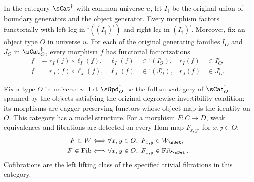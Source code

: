 \begin{resultblock}
\begin{theorem}
In the category $\sCat^{\dag}$ with common universe $u$, let $I_{\dag}$ be the original union of boundary generators and the object generator.
Every morphism factors functorially with left leg in ${}^{\square}((I_{\dag})^{\square})$ and right leg in $(I_{\dag})^{\square}$.
Moreover, fix an object type $O$ in universe $u$.
For each of the original generating families $I_O$ and $J_O$ in $\sCat^{\dag}_O$, every morphism $f$ has functorial factorizations
\begin{align}
f &= r_I(f)\circ\ell_I(f),
  &\ell_I(f)&\in{}^{\square}(I_O^{\square}),
  &r_I(f)&\in I_O^{\square}, \\
f &= r_J(f)\circ\ell_J(f),
  &\ell_J(f)&\in{}^{\square}(J_O^{\square}),
  &r_J(f)&\in J_O^{\square}.
\end{align}
\end{theorem}
\end{resultblock}

\begin{resultblock}
\begin{theorem}
Fix a type $O$ in universe $u$.
Let $\sGpd^{\dag}_O$ be the full subcategory of $\sCat^{\dag}_O$ spanned by the objects satisfying the original degreewise invertibility condition; its morphisms are dagger-preserving functors whose object map is the identity on $O$.
This category has a model structure.
For a morphism $F:C\to D$, weak equivalences and fibrations are detected on every Hom map $F_{x,y}$, for $x,y\in O$:
\begin{align}
F\in W
  &\Longleftrightarrow
    \forall x,y\in O,\;F_{x,y}\in W_{\sSet}, \\
F\in\Fib
  &\Longleftrightarrow
    \forall x,y\in O,\;F_{x,y}\in\Fib_{\sSet}.
\end{align}
Cofibrations are the left lifting class of the specified trivial fibrations in this category.
\end{theorem}
\end{resultblock}

